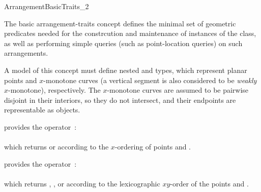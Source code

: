 
\ccRefPageBegin

\begin{ccRefConcept}{ArrangementBasicTraits_2}

\ccDefinition

The basic arrangement-traits concept defines the minimal set of geometric
predicates needed for the constrcution and maintenance of instances of the
 class, as well as performing simple queries (such as
point-location queries) on such arrangements.

A model of this concept must define nested  and
 types, which represent planar points and
$x$-monotone curves (a vertical segment is also considered to be
{\sl weakly} $x$-monotone), respectively. The $x$-monotone curves are assumed
to be pairwise disjoint in their interiors, so they do not intersect, and
their endpoints are representable as  objects.

\ccTypes






\ccThreeToTwo

{provides the operator~: \\
  \\
 which returns  or  according to the
 $x$-ordering of points  and .}

{provides the operator~: \\
  \\
 which returns , , or  according to the
 lexicographic $xy$-order of the points  and .}


\end{ccRefConcept}
